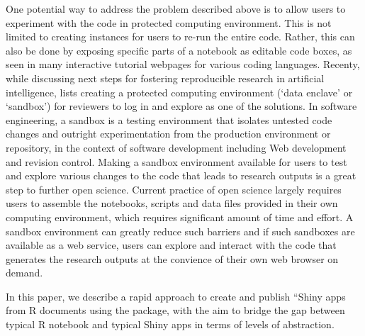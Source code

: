 One potential way to address the problem described above is to allow
users to experiment with the code in protected computing environment.
This is not limited to creating instances for users to re-run the entire
code. Rather, this can also be done by exposing specific parts of a
notebook as editable \DIFaddbegin {}\DIFaddend code boxes, as seen in many
interactive tutorial webpages for various coding languages. Recenty,
while discussing next steps for fostering reproducible research in
artificial intelligence, \citet{Carter2019} lists creating a protected
computing environment (`data enclave' or `sandbox') for reviewers to log
in and explore as one of the solutions. In software engineering, a
sandbox is a testing environment that isolates untested code changes and
outright experimentation from the production environment or repository,
in the context of software development including Web development and
revision control. Making a sandbox environment available for users to
test and explore various changes to the code that leads to research
outputs is a great step to further open science. Current practice of
open science largely requires users to assemble the notebooks, scripts
and data files provided in their own computing environment, which
requires significant amount of time and effort. A sandbox environment
can greatly reduce such barriers and if such sandboxes are available as
a web service, users can explore and interact with the code that
generates the research outputs at the convience of their own web browser
on demand.

In this paper, we describe a rapid approach to create and publish
``\DIFdelbegin {}\DIFdelend \DIFaddbegin {}\DIFaddend Shiny apps from R \DIFdelbegin {}\DIFdelend \DIFaddbegin {}\DIFaddend documents using
the \DIFdelbegin \emph{}
\DIFdelend \DIFaddbegin {} \DIFaddend package, with the aim to bridge the gap between
typical R \DIFdelbegin {}\DIFdelend \DIFaddbegin {}\DIFaddend notebook and typical Shiny apps in terms of levels of
abstraction. \DIFaddbegin {}\DIFaddend 

